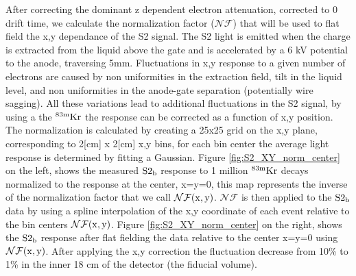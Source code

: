 After correcting the dominant z dependent electron attenuation, corrected to 0 drift time, we calculate the normalization factor ($\mathcal{NF}$) that will be used to flat field the x,y dependance of the S2 signal. The S2 light is emitted when the charge is extracted from the liquid above the gate and is accelerated by a 6 kV potential to the anode, traversing 5mm. Fluctuations in x,y response to a given number of electrons are caused by non uniformities in the extraction field, tilt in the liquid level, and non uniformities in the anode-gate separation (potentially wire sagging). All these variations lead to additional fluctuations in the S2 signal, by using a the $\rm^{83m}Kr$ the response can be corrected as a function of  x,y position. The normalization is calculated by creating a 25x25 grid on the x,y plane, corresponding to 2[cm] x 2[cm] x,y bins, for each bin center the average light response is determined by fitting a Gaussian. Figure \ref{fig:S2_XY_norm_center} on the left, shows the measured $\rm S2_b$ response to 1 million $\rm^{83m}Kr$ decays normalized to the response at the center, x=y=0, this map represents the inverse of the normalization factor that we call $\rm\mathcal{NF}(x,y)$. $\mathcal{NF}$ is then applied to the $\rm S2_b$ data by using a spline interpolation of the x,y coordinate of each event relative to the bin centers $\rm\mathcal{NF}(x,y)$. Figure \ref{fig:S2_XY_norm_center} on the right, shows the $\rm S2_b$ response after flat fielding the data relative to the center x=y=0 using $\rm\mathcal{NF}(x,y)$. After applying the x,y correction the fluctuation decrease from 10\% to 1\% in the inner 18 cm of the detector (the fiducial volume).


